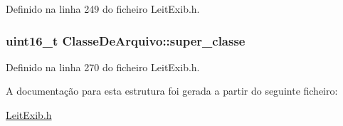 Definido na linha 249 do ficheiro Leit\-Exib.\-h.

\hypertarget{struct_classe_de_arquivo_a250195b0cd2dfc88bf912da18aa9d558}{
\subsubsection[{super\-\_\-classe}]{\setlength{\rightskip}{0pt plus 5cm}uint16\-\_\-t Classe\-De\-Arquivo\-::super\-\_\-classe}}\label{struct_classe_de_arquivo_a250195b0cd2dfc88bf912da18aa9d558}


Definido na linha 270 do ficheiro Leit\-Exib.\-h.



A documentação para esta estrutura foi gerada a partir do seguinte ficheiro\-:\begin{DoxyCompactItemize}
\item 
\hyperlink{_leit_exib_8h}{Leit\-Exib.\-h}\end{DoxyCompactItemize}
